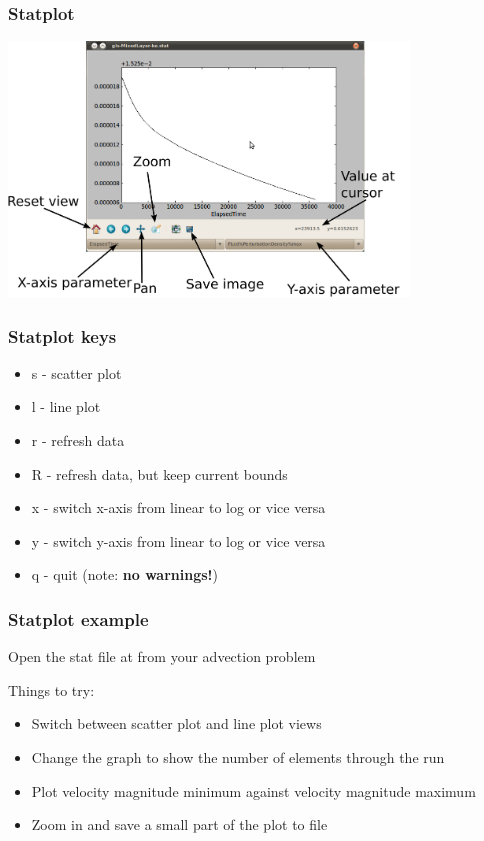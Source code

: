 \documentclass[12pt]{beamer}
\begin{document}
\begin{frame}
    \frametitle{Statplot}
\begin{center}
\includegraphics[width=0.8\textwidth]{images/statplot_labelled.png}
\end{center}
\end{frame}

\begin{frame}
    \frametitle{Statplot keys}
\begin{itemize}
\item s - scatter plot
\item l - line plot
\item r - refresh data
\item R - refresh data, but keep current bounds
\item x - switch x-axis from linear to log or vice versa
\item y - switch y-axis from linear to log or vice versa
\item q - quit (note: \textbf{no warnings!})
\end{itemize}
\end{frame}

\begin{frame}
    \frametitle{Statplot example}
Open the stat file at from your advection problem

Things to try:
\begin{itemize}
\item Switch between scatter plot and line plot views
\item Change the graph to show the number of elements through the run
\item Plot velocity magnitude minimum against velocity magnitude maximum
\item Zoom in and save a small part of the plot to file
\end{itemize}
\end{frame}
\end{document}
